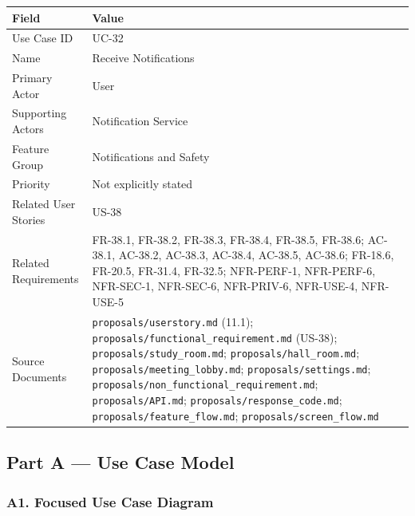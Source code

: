 \documentclass[12pt]{article}
\renewcommand{\baselinestretch}{1.5}
\begin{document}
\begingroup
\small
\renewcommand{\baselinestretch}{1.0}\selectfont
\renewcommand{\arraystretch}{1.15}
\setlength{\tabcolsep}{6pt}
\begin{longtable}{|>{\raggedright\arraybackslash}p{}|>{\raggedright\arraybackslash}p{}|}
\hline
\textbf{Field} & \textbf{Value} \\ \hline
\endhead
Use Case ID & UC-32 \\ \hline
Name & Receive Notifications \\ \hline
Primary Actor & User \\ \hline
Supporting Actors & Notification Service \\ \hline
Feature Group & Notifications and Safety \\ \hline
Priority & Not explicitly stated \\ \hline
Related User Stories & US-38 \\ \hline
Related Requirements & FR-38.1, FR-38.2, FR-38.3, FR-38.4, FR-38.5, FR-38.6; AC-38.1, AC-38.2, AC-38.3, AC-38.4, AC-38.5, AC-38.6; FR-18.6, FR-20.5, FR-31.4, FR-32.5; NFR-PERF-1, NFR-PERF-6, NFR-SEC-1, NFR-SEC-6, NFR-PRIV-6, NFR-USE-4, NFR-USE-5 \\ \hline
Source Documents & \texttt{proposals/userstory.md} (11.1); \texttt{proposals/functional\_requirement.md} (US-38); \texttt{proposals/study\_room.md}; \texttt{proposals/hall\_room.md}; \texttt{proposals/meeting\_lobby.md}; \texttt{proposals/settings.md}; \texttt{proposals/non\_functional\_requirement.md}; \texttt{proposals/API.md}; \texttt{proposals/response\_code.md}; \texttt{proposals/feature\_flow.md}; \texttt{proposals/screen\_flow.md} \\ \hline
\end{longtable}
\endgroup
\par\medskip

\hypertarget{sec:part-a-use-case-model}{}
\subsection*{Part A --- Use Case Model}
\par\medskip

\hypertarget{sec:a1-focused-use-case-diagram}{}
\subsubsection*{A1. Focused Use Case Diagram}
\par\medskip
\end{document}
